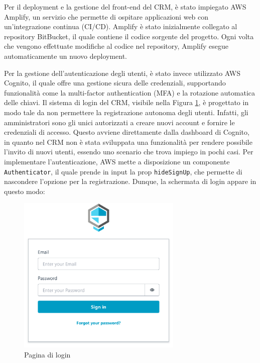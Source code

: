 \documentclass[target=bach,aauheader=,style=]{thud}
\begin{document}
\noindent Per il deployment e la gestione del front-end del CRM, è stato impiegato AWS Amplify, un servizio che permette di ospitare applicazioni web con un'integrazione continua (CI/CD). Amplify è stato inizialmente collegato al repository BitBucket, il quale contiene il codice sorgente del progetto. Ogni volta che vengono effettuate modifiche al codice nel repository, Amplify esegue automaticamente un nuovo deployment.

\noindent Per la gestione dell'autenticazione degli utenti, è stato invece utilizzato AWS Cognito, il quale offre una gestione sicura delle credenziali, supportando funzionalità come la multi-factor authentication (MFA) e la rotazione automatica delle chiavi. Il sistema di login del CRM, visibile nella Figura \ref{login}, è progettato in modo tale da non permettere la registrazione autonoma degli utenti. Infatti, gli amministratori sono gli unici autorizzati a creare nuovi account e fornire le credenziali di accesso. Questo avviene direttamente dalla dashboard di Cognito, in quanto nel CRM non è stata sviluppata una funzionalità per rendere possibile l'invito di nuovi utenti, essendo uno scenario che trova impiego in pochi casi. Per implementare l'autenticazione, AWS mette a disposizione un componente \texttt{Authenticator}, il quale prende in input la prop \texttt{hideSignUp}, che permette di nascondere l'opzione per la registrazione. Dunque, la schermata di login appare in questo modo:

\begin{figure}[H]
    \centering
    \includegraphics[width=0.7\textwidth]{img/login.pdf} 
    \caption{Pagina di login}
    \label{login}
\end{figure}
\end{document}

